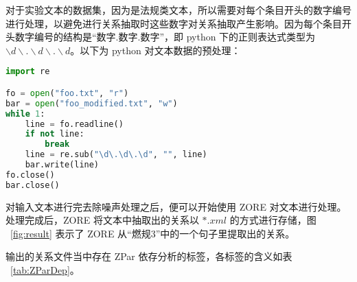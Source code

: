 对于实验文本的数据集，因为是法规类文本，所以需要对每个条目开头的数字编号进行处理，以避免进行关系抽取时这些数字对关系抽取产生影响。因为每个条目开头数字编号的结构是“数字.数字.数字”，即 python 下的正则表达式类型为 $\backslash d\backslash .\backslash d\backslash .\backslash d$。以下为 python 对文本数据的预处理：

\begin{lstlisting}[language=python, caption=python 文本预处理, label={code:pythonpreprocess}]
import re

fo = open("foo.txt", "r")
bar = open("foo_modified.txt", "w")
while 1:
    line = fo.readline()
    if not line:
        break
    line = re.sub("\d\.\d\.\d", "", line)
    bar.write(line)
fo.close()
bar.close()
\end{lstlisting}

对输入文本进行完去除噪声处理之后，便可以开始使用 ZORE 对文本进行处理。处理完成后，ZORE 将文本中抽取出的关系以 $*.xml$ 的方式进行存储，图 ~\ref{fig:result} 表示了 ZORE 从“燃规3”中的一个句子里提取出的关系。

输出的关系文件当中存在 ZPar 依存分析的标签，各标签的含义如表 ~\ref{tab:ZParDep}。

